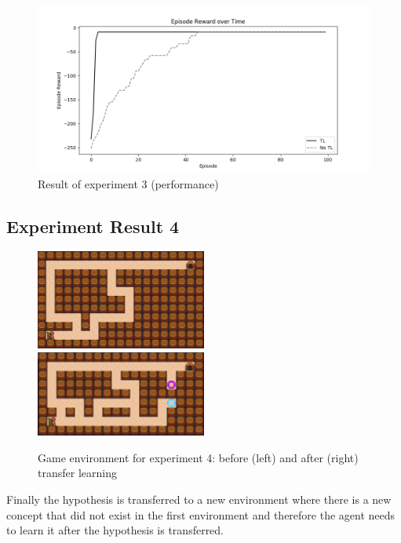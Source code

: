 \begin{figure}[!htb]
\centering
\includegraphics[width=1.0\textwidth]{./figures/experiment4_after_test}
\caption{Result of experiment 3 (performance)}
\label{experiment3_test}
\end{figure}

\subsection{Experiment Result 4}
\label{subsec:experiment_result_4}

\begin{figure}[!htb]
\centerline{
\includegraphics[width=0.5\textwidth]{./figures/experiment4_before}
\includegraphics[width=0.5\textwidth]{./figures/experiment5_after}}
\caption{Game environment for experiment 4: before (left) and after (right) transfer learning}
\label{experiment5}
\end{figure}

Finally the hypothesis is transferred to a new environment where there is a new concept that did not exist in the first environment
and therefore the agent needs to learn it after the hypothesis is transferred.

